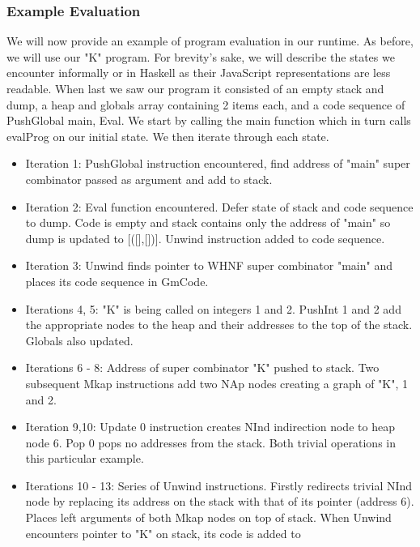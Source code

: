 \subsubsection{Example Evaluation}
We will now provide an example of program evaluation in our runtime.
As before, we will use our "K" program. For brevity's sake, we will
describe the states we encounter informally or in Haskell as their
JavaScript representations are less readable. When last we saw our
program it consisted of an empty stack and dump, a heap and globals
array containing 2 items each, and a code sequence of PushGlobal
main, Eval. We start by calling the main function which in turn
calls evalProg on our initial state. We then iterate through each
state.

\begin{itemize}
    \item Iteration 1: PushGlobal instruction encountered, find
          address of "main" super combinator passed as argument
          and add to stack. 
    \item Iteration 2: Eval function encountered. Defer state of
          stack and code sequence to dump. Code is empty and stack
          contains only the address of "main" so dump is updated
          to [([],[])]. Unwind instruction added to code sequence.
    \item Iteration 3: Unwind finds pointer to WHNF super combinator
          "main" and places its code sequence in GmCode.
    \item Iterations 4, 5: "K" is being called on integers 1 and 2.
          PushInt 1 and 2 add the appropriate nodes to the heap and
          their addresses to the top of the stack. Globals also
          updated.
    \item Iterations 6 - 8: Address of super combinator "K" pushed
          to stack. Two subsequent Mkap instructions add two NAp
          nodes creating a graph of "K", 1 and 2. 
    \item Iteration 9,10: Update 0 instruction creates NInd
          indirection node to heap node 6. Pop 0 pops no addresses
          from the stack. Both trivial operations in this particular
          example.
    \item Iterations 10 - 13: Series of Unwind instructions. Firstly
          redirects trivial NInd node by replacing its address on the
          stack with that of its pointer (address 6). Places left
          arguments of both Mkap nodes on top of stack. When Unwind
          encounters pointer to "K" on stack, its code is added to

\end{itemize}
